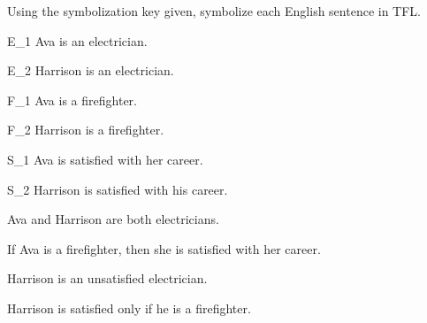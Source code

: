 \begin{practiceproblems}
\problempart Using the symbolization key given, symbolize each English sentence in TFL.\label{pr.avacareer}
	\begin{ekey}
		\item[E_1] Ava is an electrician.
		\item[E_2] Harrison is an electrician.
		\item[F_1] Ava is a firefighter.
		\item[F_2] Harrison is a firefighter.
		\item[S_1] Ava is satisfied with her career.
		\item[S_2] Harrison is satisfied with his career.
	\end{ekey}
\begin{earg}
\item Ava and Harrison are both electricians. 
\item If Ava is a firefighter, then she is satisfied with her career.
\item Harrison is an unsatisfied electrician.
\item Harrison is satisfied only if he is a firefighter.
\end{earg}



\end{practiceproblems}

